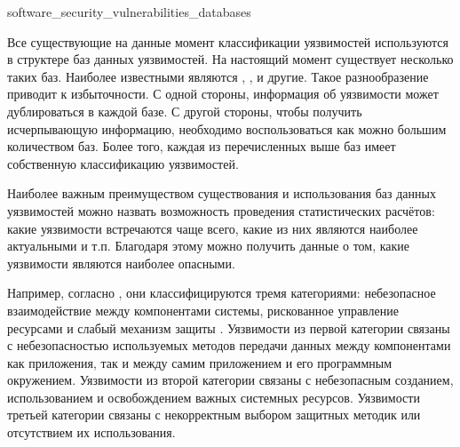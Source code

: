 	{software_security_vulnerabilities_databases}

%
Все существующие на данные момент классификации уязвимостей используются в структере баз данных уязвимостей.
%
На настоящий момент существует несколько таких баз. 
%
Наиболее известными являются  ,  ,   и другие. 
%
Такое разнообразение приводит к избыточности.
%
С одной стороны, информация об уязвимости может дублироваться в каждой базе.
%
С другой стороны, чтобы получить исчерпывающую информацию, необходимо воспользоваться как можно большим количеством баз.
%
Более того, каждая из перечисленных выше баз имеет собственную классификацию уязвимостей.

%
Наиболее важным преимуществом существования и использования баз данных уязвимостей можно назвать возможность проведения статистических расчётов: какие уязвимости встречаются чаще всего, какие из них являются наиболее актуальными и т.п.
%
Благодаря этому можно получить данные о том, какие уязвимости являются наиболее опасными. 

%
Например, согласно , они классифицируются тремя категориями: небезопасное взаимодействие между компонентами системы, рискованное управление ресурсами и слабый механизм защиты .
%
Уязвимости из первой категории связаны с небезопасностью используемых методов передачи данных между компонентами как приложения, так и между самим приложением и его программным окружением. 
%
Уязвимости из второй категории связаны с небезопасным созданием, использованием и освобождением важных системных ресурсов. 
%
Уязвимости третьей категории связаны с некорректным выбором защитных методик или отсутствием их использования.